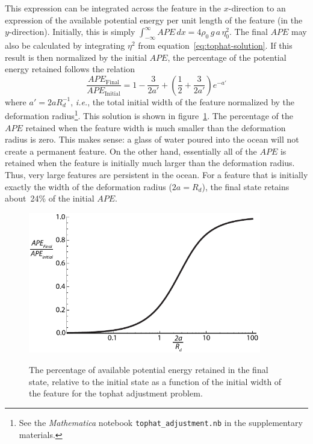 \documentclass[11pt]{report}
\numberwithin{equation}{section}
\begin{document}
This expression can be integrated across the feature in the $x$-direction to an expression of the available potential energy per unit length of the feature (in the $y$-direction).  Initially, this is simply $\int_{-\infty}^{\infty} APE\,dx = 4 \rho_0\,g\,a\,\eta_0^2$.  The final $APE$ may also be calculated by integrating $\eta^2$ from equation~\ref{eq:tophat-solution}.  If this result is then normalized by the initial $APE$, the percentage of the potential energy retained follows the relation
\begin{equation}
    \frac{APE_{\mathrm{Final}}}{APE_{\mathrm{Initial}}} = 1 - \frac{3}{2a'} + \left( \frac{1}{2} + \frac{3}{2a'} \right) e^{-a'}
\end{equation}
where $a' = 2 a R_d^{-1}$, \emph{i.e.}, the total initial width of the feature normalized by the deformation radius\footnote{See the \emph{Mathematica} notebook {\tt tophat\_adjustment.nb} in the supplementary materials.}.  This solution is shown in figure~\ref{fig:APE_tophat}.  
The percentage of the $APE$ retained when the feature width is much smaller than the deformation radius is zero.  This makes sense:  a glass of water poured into the ocean will not create a permanent feature.  On the other hand, essentially all of the $APE$ is retained when the feature is initially much larger than the deformation radius.  Thus, very large features are persistent in the ocean.  For a feature that is initially exactly the width of the deformation radius ($2 a = R_d$), the final state retains about~24\% of the initial $APE$.

\begin{figure}
    \centering
    \includegraphics[width=4.0in]{APE_tophat}
    \label{fig:APE_tophat}
    \caption{The percentage of available potential energy retained in the final state, relative to the initial state as a function of the initial width of the feature for the tophat adjustment problem.}
\end{figure}
\end{document}
